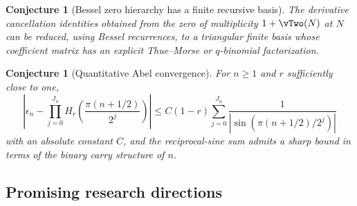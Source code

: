 \documentclass[11pt,oneside]{article}
\newtheorem{conjecture}[theorem]{Conjecture}
\theoremstyle{definition}
\begin{document}
\begin{conjecture}[Bessel zero hierarchy has a finite recursive basis]
\label{p4:conj:Bessel-basis}
The derivative cancellation identities obtained from the zero of multiplicity
\(1+\vTwo(N)\) at \(N\) can be reduced, using Bessel recurrences, to a triangular finite
basis whose coefficient matrix has an explicit Thue--Morse or \(q\)-binomial factorization.
\end{conjecture}

\begin{conjecture}[Quantitative Abel convergence]
\label{p4:conj:Abel-rate}
For \(n\ge1\) and \(r\) sufficiently close to one,
\begin{equation}
 \left|\epsilon_n-\prod_{j=0}^{J_n}H_r\!\left(
 \frac{\pi(n+1/2)}{2^j}\right)\right|
 \le C(1-r)\sum_{j=0}^{J_n}\frac{1}{|\sin(\pi(n+1/2)/2^j)|}
 \label{p4:eq:Abel-rate}
\end{equation}
with an absolute constant \(C\), and the reciprocal-sine sum admits a sharp bound in terms
of the binary carry structure of \(n\).
\end{conjecture}

\subsection{Promising research directions}
\end{document}
